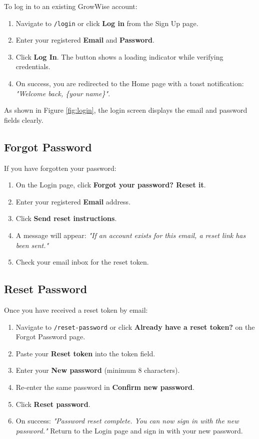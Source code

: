 \documentclass{FastFyp}
\begin{document}
To log in to an existing GrowWise account:

\begin{enumerate}
    \item Navigate to \texttt{/login} or click \textbf{Log in} from the Sign Up page.
    \item Enter your registered \textbf{Email} and \textbf{Password}.
    \item Click \textbf{Log In}. The button shows a loading indicator while verifying credentials.
    \item On success, you are redirected to the Home page with a toast notification: \textit{"Welcome back, \{your name\}"}.
\end{enumerate}

As shown in Figure \ref{fig:login}, the login screen displays the email and password fields clearly.

\subsection{Forgot Password}

If you have forgotten your password:

\begin{enumerate}
    \item On the Login page, click \textbf{Forgot your password? Reset it}.
    \item Enter your registered \textbf{Email} address.
    \item Click \textbf{Send reset instructions}.
    \item A message will appear: \textit{"If an account exists for this email, a reset link has been sent."}
    \item Check your email inbox for the reset token.
\end{enumerate}

\subsection{Reset Password}

Once you have received a reset token by email:

\begin{enumerate}
    \item Navigate to \texttt{/reset-password} or click \textbf{Already have a reset token?} on the Forgot Password page.
    \item Paste your \textbf{Reset token} into the token field.
    \item Enter your \textbf{New password} (minimum 8 characters).
    \item Re-enter the same password in \textbf{Confirm new password}.
    \item Click \textbf{Reset password}.
    \item On success: \textit{"Password reset complete. You can now sign in with the new password."} Return to the Login page and sign in with your new password.
\end{enumerate}
\end{document}
